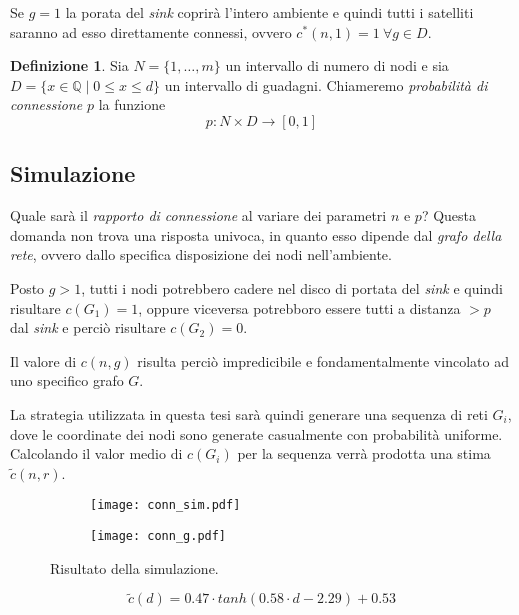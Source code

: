 \documentclass[a4paper,12pt]{article}
\theoremstyle{definition}
\newtheorem{definition}{Definizione}
\begin{document}
Se $g = 1$ la porata del \emph{sink} coprirà l'intero ambiente e quindi tutti i satelliti saranno ad esso direttamente connessi, ovvero $c^{*}(n, 1) = 1 \ \forall g \in D$. 

\begin{definition}
Sia $N = \{1, \dots, m\}$ un intervallo di numero di nodi e sia $D = \{x \in \mathbb{Q} \mid 0 \leq x \leq d\}$ un intervallo di guadagni. Chiameremo \emph{probabilità di connessione} $p$ la funzione
$$ p \colon N \times D \to [0, 1] $$
\end{definition}

\subsection{Simulazione}

Quale sarà il \emph{rapporto di connessione} al variare dei parametri $n$ e $p$? Questa domanda non trova una risposta univoca, in quanto esso dipende dal \emph{grafo della rete}, ovvero dallo specifica disposizione dei nodi nell'ambiente.

Posto $g > 1$, tutti i nodi potrebbero cadere nel disco di portata del \emph{sink} e quindi risultare $c(G_1) = 1$, oppure viceversa potrebboro essere tutti a distanza $> p$ dal \emph{sink} e perciò risultare $c(G_2) = 0$.

Il valore di $c(n, g)$ risulta perciò impredicibile e fondamentalmente vincolato ad uno specifico grafo $G$.

La strategia utilizzata in questa tesi sarà quindi generare una sequenza di reti $G_i$, dove le coordinate dei nodi sono generate casualmente con probabilità uniforme. Calcolando il valor medio di $c(G_i)$ per la sequenza verrà prodotta una stima $\tilde{c}(n, r)$.

\begin{figure}[h]
\begin{subfigure}[b]{0.5\textwidth}
\texttt{[image: conn\_sim.pdf]}
\caption{}
\end{subfigure}
\begin{subfigure}[b]{0.5\textwidth}
\texttt{[image: conn\_g.pdf]}
\caption{}
\end{subfigure}
\caption{Risultato della simulazione.}%
\end{figure}

\begin{equation}
\tilde{c}(d) = 0.47 \cdot tanh(0.58 \cdot d - 2.29) + 0.53
\end{equation}
\end{document}
